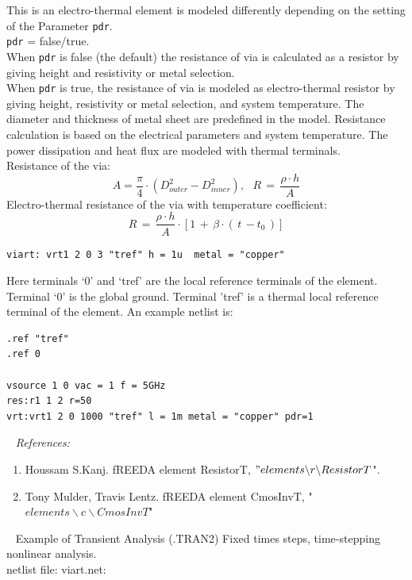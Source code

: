 \documentclass{article}
\begin{document}
\noindent This is an electro-thermal element  is modeled differently depending on the setting of the Parameter \texttt{pdr}.\\[0.2in]
\texttt{pdr} = false/true.\\[0.1in]
 When  \texttt{pdr} is false (the default) the resistance of via is calculated as a resistor by giving height and resistivity or metal selection.\\
 When  \texttt{pdr} is true, the resistance of via is modeled as electro-thermal resistor by giving height, resistivity or metal selection, and system temperature. The diameter and thickness of metal sheet are predefined in the model. Resistance calculation is based on the electrical parameters and system temperature. The power dissipation and heat flux are modeled with thermal terminals.\\[0.1in]
 \newline
 Resistance of the via:\\
 $$A = \frac{\pi}{4} \cdot ( D^2_{outer} - D^2_{inner}  ), \,\,\,\, R\,=\, \frac{\rho \cdot h}{A}$$
\newline
Electro-thermal resistance of the via with temperature coefficient:
$$R \,=\, \frac{\rho \cdot h}{A}  \cdot \left[  1\, + \, \beta \cdot  (\, t\, - t_0\,) \right] $$
\begin{verbatim}
viart: vrt1 2 0 3 "tref" h = 1u  metal = "copper"
\end{verbatim}
Here terminals `0' and `tref' are the local reference terminals of the element. Terminal `0' is the global ground.  Terminal 'tref' is a thermal local reference terminal of the element. An example netlist is:
\begin{verbatim}
.ref "tref"
.ref 0

vsource 1 0 vac = 1 f = 5GHz
res:r1 1 2 r=50
vrt:vrt1 2 0 1000 "tref" l = 1m metal = "copper" pdr=1
\end{verbatim}
~
\myThickLine
\textit{References:}\\
\begin{enumerate}
\item Houssam S.Kanj. fREEDA element ResistorT, $"elements\backslash r\backslash ResistorT$".
\item Tony Mulder, Travis Lentz. fREEDA element CmosInvT, "$elements\backslash c\backslash CmosInvT$"
\end{enumerate}
~
\myThickLine
Example of Transient Analysis (.TRAN2) Fixed times steps, time-stepping nonlinear analysis.\\
netlist file: viart.net:

\end{document}
